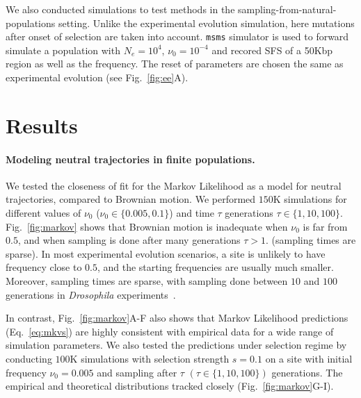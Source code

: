 \documentclass[11pt]{article}
\begin{document}
We also conducted simulations to test methods in the
sampling-from-natural-populations setting. Unlike the experimental evolution 
simulation, here mutations after onset of selection are taken into account. 
\texttt{msms} simulator is
used to forward simulate a population with $N_e=10^4$, $\nu_0=10^{-4}$
and recored SFS of a 50Kbp region as well as the frequency. The reset
of parameters are chosen the same as experimental evolution (see
Fig.~\ref{fig:ee}A). 



\section{Results}
\paragraph{Modeling neutral trajectories in finite populations.} 
We tested the closeness of fit for the Markov Likelihood as a model
for neutral trajectories, compared to Brownian motion. We performed
$150$K simulations for different values of $\nu_0$
($\nu_0\in\{0.005,0.1\}$) and time $\tau$ generations $\tau\in
\{1,10,100\}$. 
Fig.~\ref{fig:markov} shows that Brownian motion is inadequate when
$\nu_0$ is far from $0.5$, and when sampling is done after many
generations $\tau>1$. (sampling times are sparse). In most
experimental evolution scenarios, a site is unlikely to have frequency
close to $0.5$, and the starting frequencies are usually much
smaller. Moreover, sampling times are sparse, with sampling done
between $10$ and $100$ generations in \emph{Drosophila}
experiments~\cite{orozco2012adaptation, zhou2011experimental}.

In contrast, Fig.~\ref{fig:markov}A-F also shows that Markov
Likelihood predictions (Eq.~\ref{eq:mkvs}) are highly consistent with
empirical data for a wide range of simulation parameters. We also
tested the predictions under selection regime by conducting $100$K
simulations with selection strength $s=0.1$ on a site with initial
frequency $\nu_0=0.005$ and sampling after $\tau$
$(\tau\in\{1,10,100\})$ generations. The empirical and theoretical
distributions tracked closely (Fig.~\ref{fig:markov}G-I).
\end{document}
